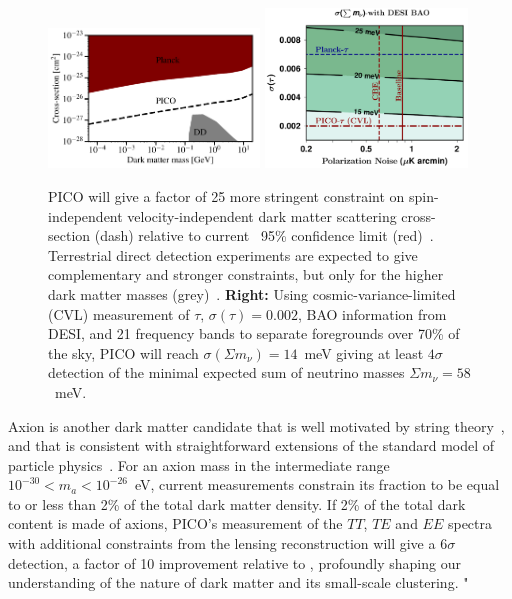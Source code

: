 \documentclass[PICOReport.tex]{subfiles}
\begin{document}
\begin{figure}[t]
\begin{center}
\includegraphics[width=0.50\textwidth]{images/pico_dd3.pdf}
\includegraphics[width=0.48\textwidth]{images/Mnu_tauprior_final.pdf}
\caption{ PICO will give a factor of 25 more stringent constraint on spin-independent velocity-independent dark matter scattering cross-section (dash) relative to current \planck\ 95\% confidence limit (red)~\citep{2018PhRvL.121h1301G}. Terrestrial direct detection experiments are expected to give complementary and stronger constraints, but only for the higher dark matter masses (grey)~\cite{2018PhRvD..97l3013K}. 
{\bf Right:} Using cosmic-variance-limited (CVL) measurement of $\tau,\, \sigma(\tau)=0.002$, \ac{BAO} information from DESI, and 21 frequency bands to separate foregrounds over 70\% of the sky, PICO will reach $\sigma(\Sigma m_{\nu}) = 14$~meV giving at least $4\sigma$ detection of the minimal expected sum of neutrino masses $\Sigma m_{\nu} = 58$~meV. 
\label{fig:DM_baryons} }
\end{center}
\vspace{-0.15in}
\end{figure}
%

Axion is another dark matter candidate that is well motivated by string theory~\citep{Arvanitaki_etal}, and that is consistent with straightforward extensions of the standard model of particle physics~\citep{peccei,weinberg,wilczek}. For an axion mass in the intermediate range $10^{-30} < m_a< 10^{-26} $~eV, current measurements constrain its fraction to be equal to or less than 2\% of the total dark matter density. If 2\% of the total dark content is made of axions, PICO's measurement of the $TT$, $TE$ and $EE$ spectra with additional constraints from the lensing reconstruction will give a $6\sigma$ detection, a factor of 10 improvement relative to \planck , 
profoundly shaping our understanding of the nature of dark matter and its small-scale clustering. "
\end{document}
